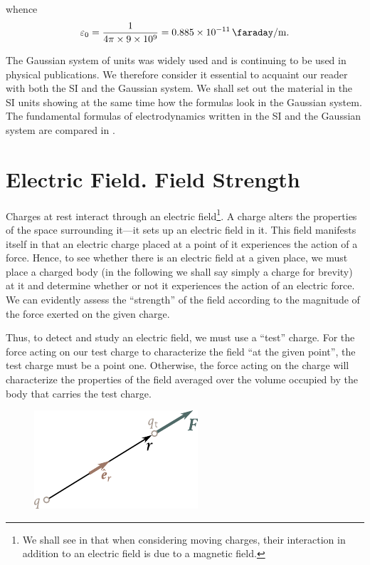 \noindent
whence
\begin{equation}\label{eq:1_12}
	\varepsilon_0 = \frac{1}{4\pi\times\num{9e9}} = \SI{0.885e-11}{\faraday\per\metre}.
\end{equation}

The Gaussian system of units was widely used and is continuing to be used in physical publications. We therefore consider it essential to acquaint our reader with both the SI and the Gaussian system. We shall set out the material in the SI units showing at the same time how the formulas look in the Gaussian system. The fundamental formulas of electrodynamics written in the SI and the Gaussian system are compared in .

\section{Electric Field. Field Strength}\label{sec:1_5}

Charges at rest interact through an electric field\footnote{We shall see in  that when considering moving charges, their interaction in addition to an electric field is due to a magnetic field.}. A charge alters the properties of the space surrounding it---it sets up an electric field in it. This field manifests itself in that an electric charge placed at a point of it experiences the action of a force. Hence, to see whether there is an electric field at a given place, we must place a charged body (in the following we shall say simply a charge for brevity) at it and determine whether or not it experiences the action of an electric force. We can evidently assess the ``strength'' of the field according to the magnitude of the force exerted on the given charge.

Thus, to detect and study an electric field, we must use a ``test'' charge. For the force acting on our test charge to characterize the field ``at the given point'', the test charge must be a point one. Otherwise, the force acting on the charge will characterize the properties of the field averaged over the volume occupied by the body that carries the test charge.

\begin{figure}[t]
	\begin{center}
		\includegraphics[scale=1]{figures/ch_01/fig_1_4.pdf}
		\caption[]{}
		\label{fig:1_4}
	\end{center}
	\vspace{-0.8cm}
\end{figure}

